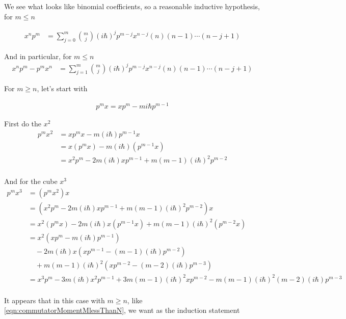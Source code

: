 We see what looks like binomial coefficients, so a reasonable inductive hypothesis, for $m \le n$

\begin{align}\label{eqn:commutatorMomentMlessThanN}
x^n p^m
&= \sum_{j=0}^m \binom{m}{j} (i \hbar)^j p^{m-j} x^{n-j} (n)(n-1)\cdots(n-j+1)
\end{align}

And in particular, for $m \le n$
\begin{align}
x^n p^m - p^m x^n
&= \sum_{j=1}^m \binom{m}{j} (i \hbar)^j p^{m-j} x^{n-j} (n)(n-1)\cdots(n-j+1) 
\end{align}

For $m \ge n$, let's start with

\begin{align*}
p^m x = x p^m -  m i \hbar p^{m-1} 
\end{align*}

First do the $x^2$
\begin{align*}
p^m x^2 
&= x p^m x -  m (i \hbar) p^{m-1} x \\
&= x (p^m x) -  m (i \hbar) (p^{m-1} x) \\
&= x^2 p^m - 2 m (i \hbar) x p^{m-1} +  m (m-1)(i \hbar)^2 p^{m-2} \\
\end{align*}

And for the cube $x^3$
\begin{align*}
p^m x^3  
&= 
( p^m x^2 ) x \\
&= 
( x^2 p^m - 2 m (i \hbar) x p^{m-1} +  m (m-1)(i \hbar)^2 p^{m-2} ) x \\
&= 
x^2 (p^m x )
- 2 m (i \hbar) x (p^{m-1} x )
+ m (m-1)(i \hbar)^2 (p^{m-2} x) \\
&= 
x^2 ( x p^m -  m (i \hbar) p^{m-1} ) \\
&\quad- 2 m (i \hbar) x ( x p^{m-1} -  (m-1) (i \hbar) p^{m-2} ) \\
&\quad+ m (m-1)(i \hbar)^2 ( x p^{m-2} -  (m-2) (i \hbar) p^{m-3} ) \\
&= 
x^3 p^m 
- 3 m (i \hbar) x^2 p^{m-1} 
+ 3 m (m-1) (i \hbar)^2 x p^{m-2} 
- m (m-1)(i \hbar)^2 (m-2) (i \hbar) p^{m-3} \\
\end{align*}

It appears that in this case with $m \ge n$, like \ref{eqn:commutatorMomentMlessThanN}, we want as the induction statement 

